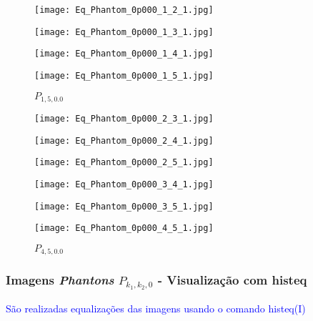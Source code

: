 \begin{figure}[!htb]
  \texttt{[image: Eq\_Phantom\_0p000\_1\_2\_1.jpg]}
	\caption{$P_{1,2,0.0}$}\label{fig:awesome_image1}
\endminipage\hfill
{}
  \texttt{[image: Eq\_Phantom\_0p000\_1\_3\_1.jpg]}
	\caption{$P_{1,3,0.0}$}\label{fig:awesome_image1}
\endminipage\hfill
{}%
  \texttt{[image: Eq\_Phantom\_0p000\_1\_4\_1.jpg]}
	\caption{ $P_{1,4,0.0}$}\label{fig:awesome_image1}
\endminipage
{}%
  \texttt{[image: Eq\_Phantom\_0p000\_1\_5\_1.jpg]}
	\caption{ $P_{1,5,0.0}$}\label{fig:awesome_image1}
\endminipage
\end{figure}
\begin{figure}[!htb]
  \texttt{[image: Eq\_Phantom\_0p000\_2\_3\_1.jpg]}
	\caption{$P_{2,3,0.0}$}\label{fig:awesome_image1}
\endminipage\hfill
{}
  \texttt{[image: Eq\_Phantom\_0p000\_2\_4\_1.jpg]}
	\caption{$P_{2,4,0.0}$}\label{fig:awesome_image1}
\endminipage\hfill
{}%
  \texttt{[image: Eq\_Phantom\_0p000\_2\_5\_1.jpg]}
	\caption{ $P_{2,5,0.0}$}\label{fig:awesome_image1}
\endminipage
{}%
  \texttt{[image: Eq\_Phantom\_0p000\_3\_4\_1.jpg]}
	\caption{ $P_{3,4,0.0}$}\label{fig:awesome_image1}
\endminipage

  \texttt{[image: Eq\_Phantom\_0p000\_3\_5\_1.jpg]}
	\caption{$P_{3,5,0.0}$}\label{fig:awesome_image1}
\endminipage\hfill
{}
  \texttt{[image: Eq\_Phantom\_0p000\_4\_5\_1.jpg]}
	\caption{$P_{4,5,0.0}$}\label{fig:awesome_image1}
\endminipage\hfill
\end{figure}

\subsubsection{Imagens  {\it Phantons} $P_{k_1,k_2,0}$ - Visualização com histeq} 


\textcolor{blue}{São realizadas equalizações das imagens usando o comando histeq(I)}

